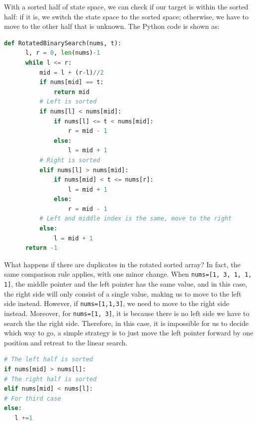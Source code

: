 \documentclass[main.tex]{subfiles}
\begin{document}
With a sorted half of state space, we can check if our target is within the sorted half: if it is, we switch the state space to the sorted space; otherwise, we have to move to the other half that is unknown. The Python code is shown as:
\begin{lstlisting}[language=Python]
def RotatedBinarySearch(nums, t):   
      l, r = 0, len(nums)-1
      while l <= r:
          mid = l + (r-l)//2
          if nums[mid] == t:
              return mid
          # Left is sorted
          if nums[l] < nums[mid]: 
              if nums[l] <= t < nums[mid]:
                  r = mid - 1
              else:
                  l = mid + 1
          # Right is sorted
          elif nums[l] > nums[mid]: 
              if nums[mid] < t <= nums[r]:
                  l = mid + 1
              else:
                  r = mid - 1
          # Left and middle index is the same, move to the right
          else: 
              l = mid + 1
      return -1
\end{lstlisting}
\begin{bclogo}[couleur = blue!30, arrondi=0.1,logo=\bccrayon,ombre=true]{What happens if there are duplicates in the rotated sorted array? } In fact, the same comparison rule applies, with one minor change. When \texttt{nums=[1, 3, 1, 1, 1]}, the middle pointer and the left pointer has the same value, and in this case, the right side will only consist of a single value, making us to move to the left side instead. However, if \texttt{nums=[1,1,3]}, we need to move to the right side instead.  Moreover, for \texttt{nums=[1, 3]}, it is because there is no left side we have to search the the right side. Therefore, in this case, it is impossible for us to decide which way to go, a simple strategy is to just move the left pointer forward by one position and retreat to the linear search. 
\begin{lstlisting}[language=Python]
# The left half is sorted
if nums[mid] > nums[l]: 
# The right half is sorted
elif nums[mid] < nums[l]: 
# For third case
else: 
   l +=1 
\end{lstlisting}
\end{bclogo}




\end{document}
